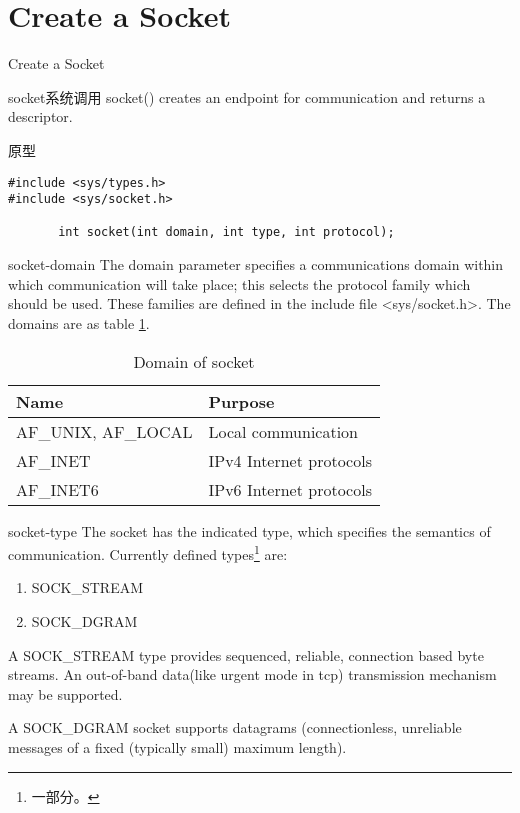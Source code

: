 \documentclass{beamer}
\begin{document}
\section{Create a Socket}
\begin{frame}
\Huge{\centerline{Create a Socket}}
\end{frame}
\begin{frame}[fragile]{socket系统调用}
socket() creates an endpoint for communication and returns a descriptor.
\begin{block}{原型}
\begin{verbatim}
#include <sys/types.h>         
#include <sys/socket.h>

       int socket(int domain, int type, int protocol);
\end{verbatim}
\end{block}
\end{frame}
\begin{frame}{socket-domain}
     The domain parameter specifies a communications domain within which communication will take place; this selects the protocol family which should be used.  These families are defined in
     the include file <sys/socket.h>.  The domains are as table \ref{skt-dm}.
\begin{table}
\begin{tabular}{ll}
\toprule
\textbf{Name}&\textbf{Purpose}\\
\midrule                                                       
       AF\_UNIX, AF\_LOCAL &  Local communication     \\        
       AF\_INET       &      IPv4 Internet protocols    \\      
       AF\_INET6     &       IPv6 Internet protocols     \\     
 \bottomrule
 \end{tabular}
\caption{Domain of socket}
\label{skt-dm}
\end{table}

\end{frame}
\begin{frame}{socket-type}
     The socket has the indicated type, which specifies the semantics of communication.  Currently defined types\footnote{一部分。} are:
\begin{enumerate}
\item
SOCK\_STREAM
\item   
SOCK\_DGRAM
\end{enumerate}
     A SOCK\_STREAM type provides sequenced, reliable,  connection based byte streams.  An out-of-band data(like urgent mode in tcp) transmission mechanism may be supported.  
     
     A SOCK\_DGRAM socket supports datagrams (connectionless, unreliable messages of a fixed (typically small) maximum length). 
\end{frame}
\end{document}
